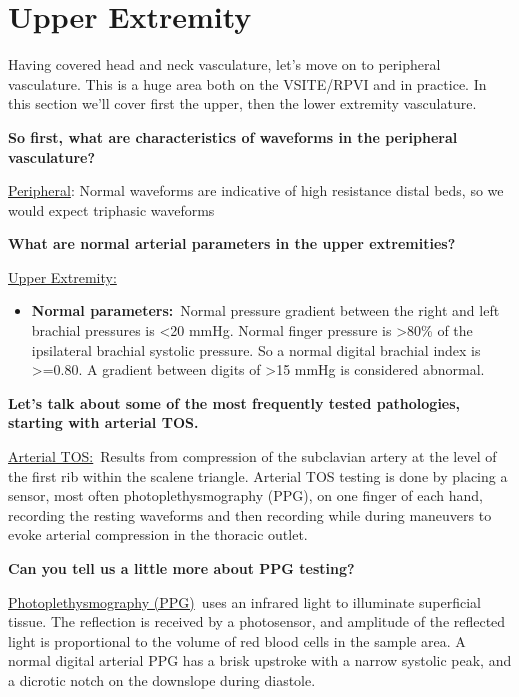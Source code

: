 \documentclass[
]{book}
\providecommand{\tightlist}{%
  \setlength{\itemsep}{0pt}\setlength{\parskip}{0pt}}
\begin{document}
\hypertarget{upper-extremity}{%
\section{Upper Extremity}\label{upper-extremity}}

Having covered head and neck vasculature, let's move on to peripheral
vasculature. This is a huge area both on the VSITE/RPVI and in practice.
In this section we'll cover first the upper, then the lower extremity
vasculature.

\textbf{So first, what are characteristics of waveforms in the peripheral
vasculature?}

\underline{Peripheral}: Normal waveforms are indicative of high resistance
distal beds, so we would expect triphasic waveforms

\textbf{What are normal arterial parameters in the upper extremities?}

\underline{Upper Extremity:}

\begin{itemize}
\tightlist
\item
  \textbf{Normal parameters:}~Normal pressure gradient between the right
  and left brachial pressures is \textless20 mmHg. Normal finger pressure
  is \textgreater80\% of the ipsilateral brachial systolic pressure. So a normal
  digital brachial index is \textgreater=0.80. A gradient between digits of \textgreater15
  mmHg is considered abnormal.~
\end{itemize}

\textbf{Let's talk about some of the most frequently tested pathologies,
starting with arterial TOS.}

\underline{Arterial TOS:}~Results from compression of the subclavian artery
at the level of the first rib within the scalene triangle. Arterial TOS
testing is done by placing a sensor, most often photoplethysmography
(PPG), on one finger of each hand, recording the resting waveforms and
then recording while during maneuvers to evoke arterial compression in
the thoracic outlet.

\textbf{Can you tell us a little more about PPG testing?}

\underline{Photoplethysmography (PPG)}~uses an infrared light to illuminate
superficial tissue. The reflection is received by a photosensor, and
amplitude of the reflected light is proportional to the volume of red
blood cells in the sample area. A normal digital arterial PPG has a
brisk upstroke with a narrow systolic peak, and a dicrotic notch on the
downslope during diastole.
\end{document}
